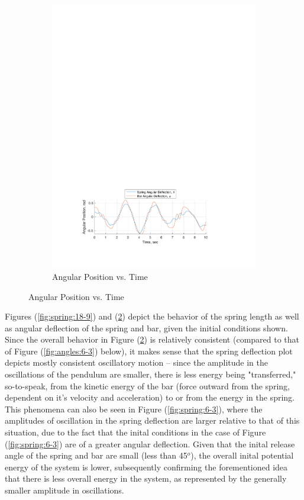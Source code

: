 \documentclass[12pt]{report}
\begin{document}
\begin{flushleft}
\begin{figure}[!ht]
\begin{subfigure}[t]{\textwidth}
  \includegraphics[center]{angles_18-9}
  \caption{Angular Position vs. Time}
  \label{fig:angles:18-9}
\end{subfigure}
\end{figure}
Figures (\ref{fig:spring:18-9}) and (\ref{fig:angles:18-9}) depict the behavior of the spring length as
well as angular deflection of the spring and bar, given the initial conditions shown.
Since the overall behavior in Figure (\ref{fig:angles:18-9}) is relatively consistent
(compared to that of Figure (\ref{fig:angles:6-3}) below), it makes sense that the spring
deflection plot depicts mostly consistent oscillatory motion -- since the amplitude in the
oscillations of the pendulum are smaller, there is less energy being "transferred," so-to-speak,
from the kinetic energy of the bar (force outward from the spring, dependent on it's velocity and acceleration)
to or from the energy in the spring. This phenomena can also be seen in Figure (\ref{fig:spring:6-3}), where the amplitudes
of oscillation in the spring deflection are larger relative to that of this situation, due to the fact that the
inital conditions in the case of Figure (\ref{fig:spring:6-3}) are of a greater
angular deflection. Given that the inital release angle
of the spring and bar are small (less than 45$^o$), the overall inital potential energy of the
system is lower, subsequently confirming the forementioned idea that there is less overall
energy in the system, as represented by the generally smaller amplitude in oscillations. \\
\newpage


\end{flushleft}
\end{document}
